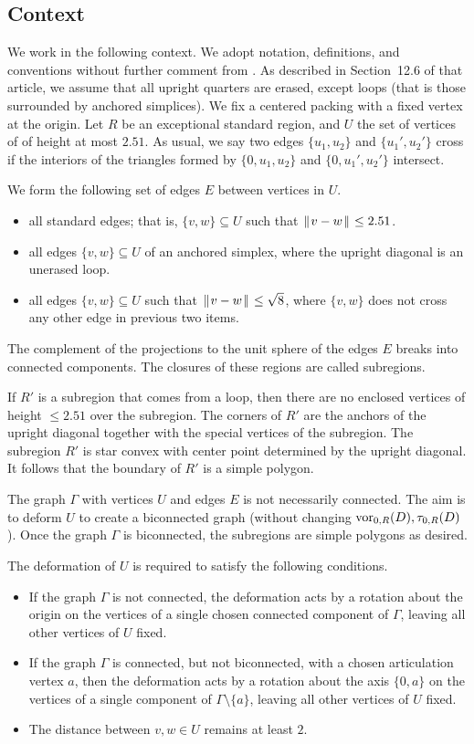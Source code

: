 \documentclass[11pt]{amsart}
\def\op#1{{\text{#1}}}
\def\text{\hbox}
\def\|{{\hskip0.1em|\hskip-0.1em|\hskip0.1em}}
\let\subset=\subseteq
\begin{document}
\subsection*{Context}

We work in the following context.  We adopt notation, definitions, and conventions without further comment
from \cite{Hales:2006:DCG}.  As described in Section~12.6 of that article, we assume that all upright quarters
are erased, except loops (that is those surrounded by anchored simplices).  We fix a centered packing with
a fixed vertex at the origin.  Let $R$ be an exceptional standard region, and
$U$ the set of vertices of of height at most $2.51$.  As usual, we say two edges $\{u_1,u_2\}$ and $\{u_1',u_2'\}$ cross
if the interiors of the triangles formed by $\{0,u_1,u_2\}$ and $\{0,u_1',u_2'\}$ intersect.

We form the following set of edges $E$ between vertices in $U$.
\begin{itemize}
\item all standard edges; that is, $\{v,w\}\subset U$ such that $\|v-w\|\le 2.51$.
\item all edges $\{v,w\}\subset U$ of an anchored simplex, where the upright diagonal is an unerased loop.
\item all edges $\{v,w\}\subset U$ such that $\|v-w\|\le\sqrt8$, where $\{v,w\}$ does not cross any other edge in previous two items.
\end{itemize}
The complement of the projections to the unit sphere of the edges $E$ 
breaks into
connected components.  The closures of these regions are called subregions.

If $R'$ is a subregion that comes from a loop, then there are no enclosed vertices of height $\le 2.51$ over the
subregion.  The corners of $R'$ are the anchors of the upright diagonal together with the special vertices
of the subregion.  The subregion $R'$ is star convex with center point determined by the upright diagonal.
It follows that the boundary of $R'$ is a simple polygon.

The graph $\Gamma$ with vertices $U$ and edges $E$ is not necessarily connected.  The aim is to deform
$U$ to create a biconnected graph (without changing $\op{vor}_{0,R}(D),\tau_{0,R}(D)$).  Once the graph $\Gamma$
is biconnected, the subregions are simple polygons as desired.

The deformation of $U$ is required to satisfy the following conditions.
\begin{itemize}
\item If the graph $\Gamma$ is not connected,
the deformation acts by a rotation about the origin 
on the vertices of a single chosen connected component of $\Gamma$,
leaving all other vertices of $U$ fixed.
\item If the graph $\Gamma$ is connected, but not biconnected, with a chosen articulation vertex $a$, then
the deformation acts by a rotation about the axis $\{0,a\}$ on the vertices of a single component of $\Gamma\setminus\{a\}$,
leaving all other vertices of $U$ fixed.
\item The distance between $v,w\in U$ remains at least $2$.
\end{itemize}
\end{document}
